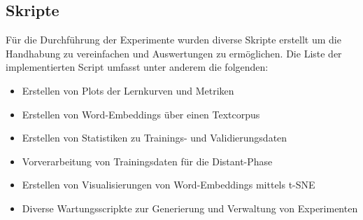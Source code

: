\subsection{Skripte}
\label{technical_setup:scripts}
Für die Durchführung der Experimente wurden diverse Skripte erstellt um die Handhabung zu vereinfachen und Auswertungen zu ermöglichen. Die Liste der implementierten Script umfasst unter anderem die folgenden:

\begin{itemize}[noitemsep]
	\item Erstellen von Plots der Lernkurven und Metriken
	\item Erstellen von Word-Embeddings über einen Textcorpus
	\item Erstellen von Statistiken zu Trainings- und Validierungsdaten
	\item Vorverarbeitung von Trainingsdaten für die Distant-Phase
	\item Erstellen von Visualisierungen von Word-Embeddings mittels t-SNE \cite{maaten2008visualizing}
	\item Diverse Wartungsscripkte zur Generierung und Verwaltung von Experimenten
\end{itemize}

